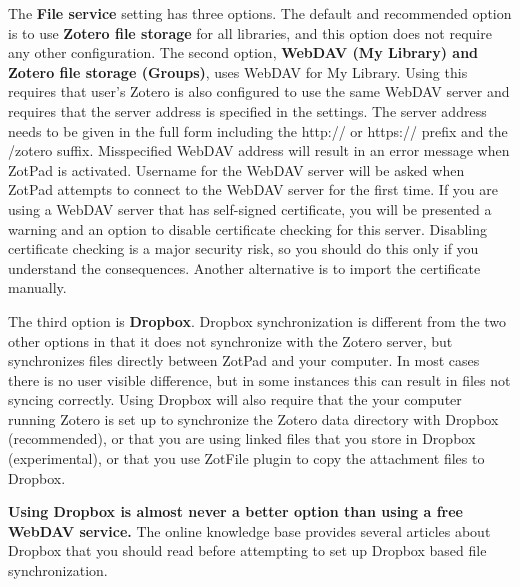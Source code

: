 \documentclass[oneside, openany, 12pt]{tufte-book}
\newcommand{\ipadfootnote}[1]{}
\newcommand{\ipadfootnote}[1]{\footnote{#1}}
\begin{document}
The \textbf{File service} setting has three options. The default and recommended option is to use \textbf{Zotero file storage} for all libraries, and this option does not require any other configuration. The second option, \textbf{WebDAV (My Library) and Zotero file storage (Groups)}, uses WebDAV for My Library. Using this requires that user's Zotero is also configured to use the same WebDAV server and requires that the server address is specified in the settings. The server address needs to be given in the full form including the http:// or https:// prefix and the /zotero suffix. Misspecified WebDAV address will result in an error message when ZotPad is activated. Username for the WebDAV server will be asked when ZotPad attempts to connect to the WebDAV server for the first time. If you are using a WebDAV server that has self-signed certificate, you will be presented a warning and an option to disable certificate checking for this server. Disabling certificate checking is a major security risk, so you should do this only if you understand the consequences. Another alternative is to import the certificate manually\ipadfootnote{See this page for instructions on how to install SSL certificates on iPad \url{http://stackoverflow.com/questions/4589562/how-to-install-my-servers-self-signed-certificate-on-an-ipad}}.

The third option is \textbf{Dropbox}. Dropbox synchronization is different from the two other options in that it does not synchronize with the Zotero server, but synchronizes files directly between ZotPad and your computer. In most cases there is no user visible difference, but in some instances this can result in files not syncing correctly\ipadfootnote{For example, if a you edit a file on your computer, but do not sync Zotero, ZotPad does not know that a new version of a file would be available in Dropbox because Zotero server is not aware of this change.}. Using Dropbox will also require that the your computer running Zotero is set up to synchronize the Zotero data directory with Dropbox (recommended), or that you are using linked files that you store in Dropbox (experimental), or that you use ZotFile plugin\ipadfootnote{More information about ZotFile can be found on the ZotFile website at \url{http://www.columbia.edu/~jpl2136/zotfile.html}. ZotPad supports all the ZotFile renaming features except collections based renaming.} to copy the attachment files to Dropbox.

\textbf{Using Dropbox is almost never a better option than using a free WebDAV service\ipadfootnote{ZotPad recommends the free CloudMe service. \url{http://www.cloudme.com}}.} The online knowledge base provides several articles about Dropbox that you should read before attempting to set up Dropbox based file synchronization.
\end{document}
